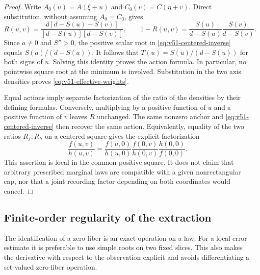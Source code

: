 \begin{proof}
Write $A_0(u)=A(\xi+u)$ and $C_0(v)=C(\eta+v)$.  Direct substitution,
without assuming $A_0=C_0$, gives
\[
 R(u,v)=\frac{d[d-S(u)-S(v)]}{[d-S(u)][d-S(v)]},\qquad
 1-R(u,v)=\frac{S(u)}{d-S(u)}\frac{S(v)}{d-S(v)}.
\]
Since $a\ne0$ and $S''>0$, the positive scalar root in
\eqref{eq:v51-centered-inverse} equals $S(a)/(d-S(a))$.  It follows
that $T(u)=S(u)/(d-S(u))$ for both signs of $u$.  Solving this identity
proves the action formula.  In particular, no pointwise square root at
the minimum is involved.  Substitution in the two axis densities proves
\eqref{eq:v51-effective-weights}.

Equal actions imply separate factorization of the ratio of the densities
by their defining formulas.  Conversely, multiplying by a positive
function of $u$ and a positive function of $v$ leaves $R$ unchanged.
The same nonzero anchor and \eqref{eq:v51-centered-inverse} then recover
the same action.  Equivalently, equality of the two ratios $R_f,R_h$
on a centered square gives the explicit factorization
\[
 \frac{f(u,v)}{h(u,v)}
 =\frac{f(u,0)}{h(u,0)}\frac{f(0,v)}{h(0,v)}
                          \frac{h(0,0)}{f(0,0)}.
\]
This assertion is local in the common positive square.  It does not claim
that arbitrary prescribed marginal laws are compatible with a given
nonrectangular cap, nor that a joint recording factor depending on both
coordinates would cancel.
\end{proof}

\subsection{Finite-order regularity of the extraction}

The identification of a zero fiber is an exact operation on a law.  For a
local error estimate it is preferable to use simple roots on two fixed
slices.  This also makes the derivative with respect to the observation
explicit and avoids differentiating a set-valued zero-fiber operation.

